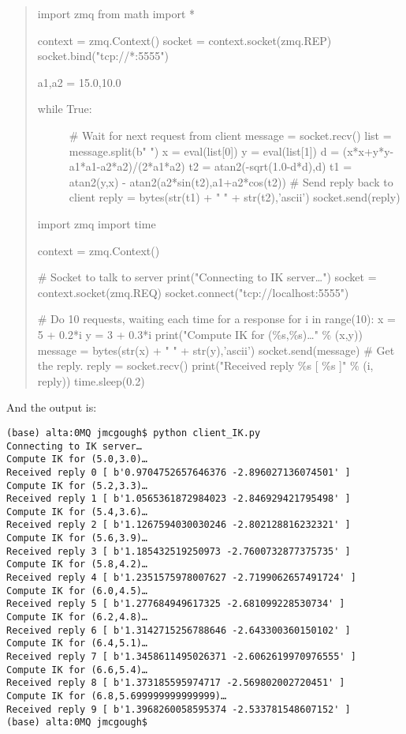 \begin{quote}
import zmq from math import *

context = zmq.Context() socket = context.socket(zmq.REP)
socket.bind("tcp://*:5555")

a1,a2 = 15.0,10.0

\begin{description}
\item[while True:]
\# Wait for next request from client message = socket.recv() list =
message.split(b" ") x = eval(list{[}0{]}) y = eval(list{[}1{]}) d =
(x*x+y*y-a1*a1-a2*a2)/(2*a1*a2) t2 = atan2(-sqrt(1.0-d*d),d) t1 =
atan2(y,x) - atan2(a2*sin(t2),a1+a2*cos(t2)) \# Send reply back to
client reply = bytes(str(t1) + " " + str(t2),'ascii') socket.send(reply)
\end{description}

import zmq import time

context = zmq.Context()

\# Socket to talk to server print("Connecting to IK server\ldots")
socket = context.socket(zmq.REQ) socket.connect("tcp://localhost:5555")

\# Do 10 requests, waiting each time for a response for i in range(10):
x = 5 + 0.2*i y = 3 + 0.3*i print("Compute IK for (\%s,\%s)\ldots" \%
(x,y)) message = bytes(str(x) + " " + str(y),'ascii')
socket.send(message) \# Get the reply. reply = socket.recv()
print("Received reply \%s {[} \%s {]}" \% (i, reply)) time.sleep(0.2)
\end{quote}

And the output is:

\begin{verbatim}
(base) alta:0MQ jmcgough$ python client_IK.py
Connecting to IK server…
Compute IK for (5.0,3.0)…
Received reply 0 [ b'0.9704752657646376 -2.896027136074501' ]
Compute IK for (5.2,3.3)…
Received reply 1 [ b'1.0565361872984023 -2.846929421795498' ]
Compute IK for (5.4,3.6)…
Received reply 2 [ b'1.1267594030030246 -2.802128816232321' ]
Compute IK for (5.6,3.9)…
Received reply 3 [ b'1.185432519250973 -2.7600732877375735' ]
Compute IK for (5.8,4.2)…
Received reply 4 [ b'1.2351575978007627 -2.7199062657491724' ]
Compute IK for (6.0,4.5)…
Received reply 5 [ b'1.277684949617325 -2.681099228530734' ]
Compute IK for (6.2,4.8)…
Received reply 6 [ b'1.3142715256788646 -2.643300360150102' ]
Compute IK for (6.4,5.1)…
Received reply 7 [ b'1.3458611495026371 -2.6062619970976555' ]
Compute IK for (6.6,5.4)…
Received reply 8 [ b'1.373185595974717 -2.569802002720451' ]
Compute IK for (6.8,5.699999999999999)…
Received reply 9 [ b'1.3968260058595374 -2.533781548607152' ]
(base) alta:0MQ jmcgough$
\end{verbatim}

